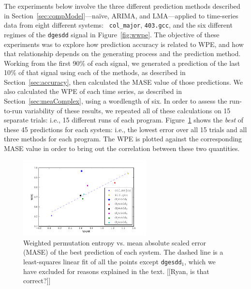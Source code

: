 







The experiments below involve the three different prediction methods
described in Section~\ref{sec:compModel}---na\"ive, ARIMA, and
LMA---applied to time-series data from eight different systems: {\tt
  col\_major}, {\tt 403.gcc}, and the six different regimes of the
{\tt dgesdd} signal in Figure~\ref{fig:wwpe}.  The objective of these
experiments was to explore how prediction accuracy is related to WPE,
and how that relationship depends on the generating process and the
prediction method.  Working from the first 90\% of each signal, we
generated a prediction of the last 10\% of that signal using each of
the methods, as described in Section~\ref{sec:accuracy}, then
calculated the MASE value of those predictions.  We also calculated
the WPE of each time series, as described in
Section~\ref{sec:meaComplex}, using a wordlength of six.  In order to
assess the run-to-run variability of these results, we repeated all of
these calculations on 15 separate trials: i.e., 15 different runs of
each program.  Figure~\ref{fig:wpe_vs_mase_best} shows the {\sl best}
of these 45 predictions for each system: i.e., the lowest error over
all 15 trials and all three methods for each program.  The WPE is
plotted against the corresponding MASE value in order to bring out the
correlation between these two quantities.
\begin{figure}[htbp]
  \centering
  \includegraphics[width=0.6\textwidth]{figs/prediction_vs_entropy}
  \caption{Weighted permutation entropy vs. mean absolute scaled error
    (MASE) of the best prediction of each system.
% 
% 
The dashed line is a least-squares linear fit of all the points except
{\tt dgesdd$_1$}, which we have excluded for reasons explained in the
text.  [[Ryan, is that correct?]]}
  \label{fig:wpe_vs_mase_best}
\end{figure}

